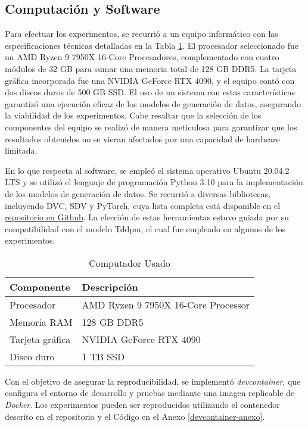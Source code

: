 \subsection{Computación y Software}
\label{subsec:computacion}
Para efectuar los experimentos, se recurrió a un equipo informático con las especificaciones técnicas detalladas en la Tabla \ref{tabla-componentes-pc}. El procesador seleccionado fue un AMD Ryzen 9 7950X 16-Core Procesadores, complementado con cuatro módulos de 32 GB para sumar una memoria total de 128 GB DDR5. La tarjeta gráfica incorporada fue una NVIDIA GeForce RTX 4090, y el equipo contó con dos discos duros de 500 GB SSD. El uso de un sistema con estas características garantizó una ejecución eficaz de los modelos de generación de datos, asegurando la viabilidad de los experimentos. Cabe resaltar que la selección de los componentes del equipo se realizó de manera meticulosa para garantizar que los resultados obtenidos no se vieran afectados por una capacidad de hardware limitada.

En lo que respecta al software, se empleó el sistema operativo Ubuntu 20.04.2 LTS y se utilizó el lenguaje de programación Python 3.10 para la implementación de los modelos de generación de datos. Se recurrió a diversas bibliotecas, incluyendo DVC, SDV y PyTorch, cuya lista completa está disponible en el \href{https://github.com/gvillarroel/synthetic-data-for-text/blob/main/freeze.txt}{repositorio en Github}. La elección de estas herramientas estuvo guiada por su compatibilidad con el modelo Tddpm, el cual fue empleado en algunos de los experimentos.


\begin{table}[H]
	\centering
	\caption{Computador Usado}
	\label{tabla-componentes-pc}
    \begin{tabular}{|l|l|}
        \hline
        \rowcolor[gray]{0.8}
        Componente & Descripción \\
        \hline
        Procesador & AMD Ryzen 9 7950X 16-Core Processor \\
        \hline
        Memoria RAM & 128 GB DDR5 \\
        \hline
        Tarjeta gráfica & NVIDIA GeForce RTX 4090 \\
        \hline
        Disco duro & 1 TB SSD \\
        \hline
      \end{tabular}        
\end{table}  

Con el objetivo de asegurar la reproducibilidad, se implementó \textit{devcontainer}, que configura el entorno de desarrollo y pruebas mediante una imagen replicable de \textit{Docker}. Los experimentos pueden ser reproducidos utilizando el contenedor descrito en el repositorio y el Código en el Anexo \ref{devcontainer-anexo}.


